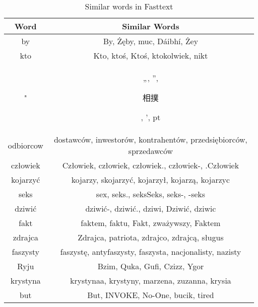 \documentclass[12pt]{article}
\begin{document}
\begin{table}[ht]
\centering
\begin{tabular}{|c|c|}
\hline
\textbf{Word}     & \textbf{Similar Words}                                                                                                          \\ \hline
by                & By, Żęby, muc, Dáibhí, Żey                                                                                                      \\ \hline
kto               & Kto, ktoś, Ktoś, ktokolwiek, nikt                                                                                                \\ \hline
"                 & „, ”, \begin{CJK}{UTF8}{bsmi}相撲\end{CJK}, ', pt                                                                                \\ \hline
odbiorcow         & dostawców, inwestorów, kontrahentów, przedsiębiorców, sprzedawców                                                                \\ \hline
człowiek          & Człowiek, człowiek, człowiek., człowiek-, .Człowiek                                                                             \\ \hline
kojarzyć          & kojarzy, skojarzyć, kojarzył, kojarzą, kojarzyc                                                                                  \\ \hline
seks              & sex, seks., seksSeks, seks-, -seks                                                                                               \\ \hline
dziwić            & dziwić-, dziwić., dziwi, Dziwić, dziwic                                                                                           \\ \hline
fakt              & faktem, faktu, Fakt, zważywszy, Faktem                                                                                           \\ \hline
zdrajca           & Zdrajca, patriota, zdrajco, zdrajcą, sługus                                                                                       \\ \hline
faszysty          & faszystę, antyfaszysty, faszysta, nacjonalisty, nazisty                                                                          \\ \hline
Ryju              & Bzim, Quka, Gufi, Czizz, Ygor                                                                                                    \\ \hline
krystyna          & krystynaa, krystyny, marzena, zuzanna, krysia                                                                                    \\ \hline
but               & But, INVOKE, No-One, bucik, tired                                                                                                \\ \hline
\end{tabular}
\caption{Similar words in Fasttext}
\end{table}
\end{document}
